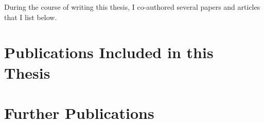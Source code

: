 
\label{ch:AuthorPublications}

During the course of writing this thesis, I co-authored several papers and articles that I list below.

\begin{refsection}[publications]
\nocite{*} %

%
%
%
%
%

\section*{Publications Included in this Thesis}

\printbibliography[
  heading=none,
  keyword=mypublication,
  keyword=partofthesis,
]

\section*{Further Publications}

\printbibliography[
  heading=none,
  keyword=mypublication,
  notkeyword=partofthesis,
]








\end{refsection}

